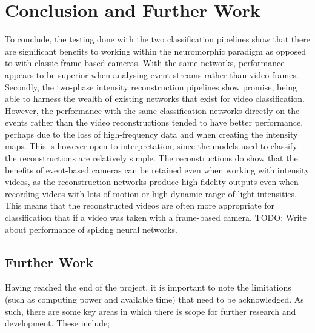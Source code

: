 \chapter{Conclusion and Further Work} \label{chap:conclusion_and_further_work}

To conclude, the testing done with the two classification pipelines show that there are significant benefits to working within the neuromorphic paradigm as opposed to with classic frame-based cameras. With the same networks, performance appears to be superior when analysing event streams rather than video frames. Secondly, the two-phase intensity reconstruction pipelines show promise, being able to harness the wealth of existing networks that exist for video classification. However, the performance with the same classification networks directly on the events rather than the video reconstructions tended to have better performance, perhaps due to the loss of high-frequency data and when creating the intensity maps. This is however open to interpretation, since the models used to classify the reconstructions are relatively simple. The reconstructions do show that the benefits of event-based cameras can be retained even when working with intensity videos, as the reconstruction networks produce high fidelity outputs even when recording videos with lots of motion or high dynamic range of light intensities. This means that the reconstructed videos are often more appropriate for classification that if a video was taken with a frame-based camera. \color{red} TODO: Write about performance of spiking neural networks. \color{black}

\section{Further Work}

Having reached the end of the project, it is important to note the limitations (such as computing power and available time) that need to be acknowledged. As such, there are some key areas in which there is scope for further research and development. These include;

